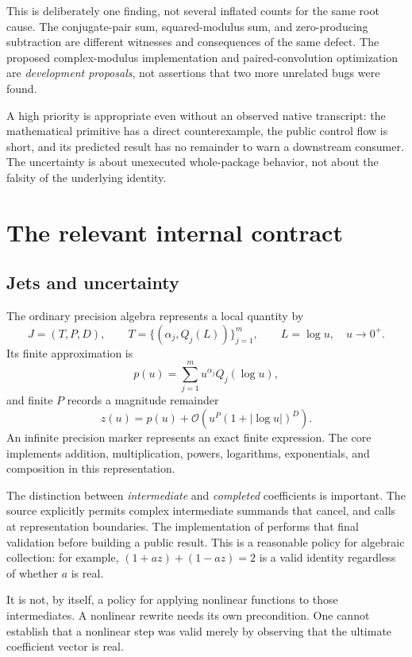 \documentclass[11pt]{article}
\newcommand{\code}[1]{\texttt{\detokenize{#1}}}
\newcommand{\OO}{\mathcal O}
\theoremstyle{remark}\newtheorem{remark}[theorem]{Remark}
\begin{document}
This is deliberately one finding, not several inflated counts for the same root
cause. The conjugate-pair sum, squared-modulus sum, and zero-producing subtraction
are different witnesses and consequences of the same defect. The proposed
complex-modulus implementation and paired-convolution optimization are
\emph{development proposals}, not assertions that two more unrelated bugs were
found.

A high priority is appropriate even without an observed native transcript:
the mathematical primitive has a direct counterexample, the public control
flow is short, and its predicted result has no remainder to warn a downstream
consumer. The uncertainty is about unexecuted whole-package behavior, not about
the falsity of the underlying identity.

\section{The relevant internal contract}
\subsection{Jets and uncertainty}
The ordinary precision algebra represents a local quantity by
\[
J=(T,P,D),\qquad
T=\{(\alpha_j,Q_j(L))\}_{j=1}^{m},\qquad L=\log u,\quad u\to0^+.
\]
Its finite approximation is
\[
 p(u)=\sum_{j=1}^{m}u^{\alpha_j}Q_j(\log u),
\]
and finite \(P\) records a magnitude remainder
\[
 z(u)=p(u)+\OO\!\left(u^P(1+|\log u|)^D\right).
\]
An infinite precision marker represents an exact finite expression.
The core implements addition, multiplication, powers, logarithms, exponentials,
and composition in this representation.\cite{core}

The distinction between \emph{intermediate} and \emph{completed} coefficients
is important. The source explicitly permits complex intermediate summands
that cancel, and calls \code{realCoefficientRows} at representation boundaries.
The implementation of \code{seriesMake} performs that final validation before
building a public result. This is a reasonable policy for algebraic collection:
for example, \((1+az)+(1-az)=2\) is a valid identity regardless of whether \(a\)
is real.\cite{core,operations}

It is not, by itself, a policy for applying nonlinear functions to those
intermediates. A nonlinear rewrite needs its own precondition. One cannot
establish that a nonlinear step was valid merely by observing that the ultimate
coefficient vector is real.
\end{document}

